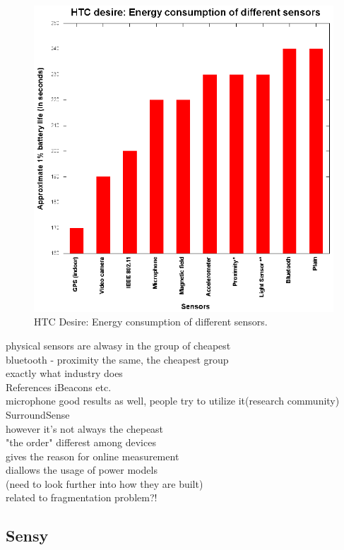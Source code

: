 \begin{figure}[H]
\centering
\includegraphics[scale=1.5]{plots/htc_desire.eps}
\caption{HTC Desire: Energy  consumption of different sensors.}
\end{figure}

physical sensors are alwasy in the group of cheapest \\

bluetooth - proximity the same, the cheapest group\\
				exactly what industry does\\
				References iBeacons etc.\\

microphone good results as well, people try to utilize it(research community)\\
				SurroundSense \cite{azizyan:surroundsense}\\
				however it's not always the chepeast\\
				
"the order" differest among devices\\
	gives the reason for online measurement\\
	diallows the usage of power models\\
		(need to look further into how they are built)\\
	related to fragmentation problem?!\\
								
\subsection{Sensy}